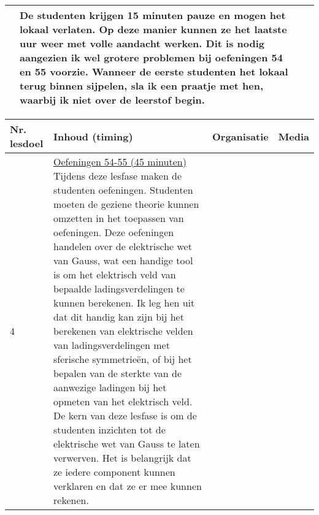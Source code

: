 \begin{landscape}
\begin{tabularx}{1.56\textwidth}{|p{1.5cm}|p{6cm}|X|p{4cm}|}
	
	&    De studenten krijgen 15 minuten pauze en mogen het lokaal verlaten. Op deze manier kunnen ze het laatste uur weer met volle aandacht werken. Dit is nodig aangezien ik wel grotere problemen bij oefeningen 54 en 55 voorzie.\newline
	Wanneer de eerste studenten het lokaal terug binnen sijpelen, sla ik een praatje met hen, waarbij ik niet over de leerstof begin. 
	& 
	\\ \hline
\end{tabularx}



\begin{tabularx}{1.56\textwidth}{|p{1.5cm}|p{6cm}|X|p{4cm}|}
	\hline
	\textbf{Nr. lesdoel } & \textbf{Inhoud (timing)}  & \textbf{Organisatie } & \textbf{Media } \\ \hline
	4\newline 5\newline 6\newline 7 \newline 8 \newline 9	&\underline{Oefeningen 54-55 (45 minuten)}\newline
	Tijdens deze lesfase maken de studenten oefeningen. Studenten moeten de geziene theorie kunnen omzetten in het toepassen van oefeningen. Deze oefeningen handelen over de elektrische wet van Gauss, wat een handige tool is om het elektrisch veld van bepaalde ladingsverdelingen te kunnen berekenen. Ik leg hen uit dat dit handig kan zijn bij het berekenen van elektrische velden van ladingsverdelingen met sferische symmetrieën, of bij het bepalen van de sterkte van de aanwezige ladingen bij het opmeten van het elektrisch veld.  \newline De kern van deze lesfase is om de studenten inzichten tot de elektrische wet van Gauss te laten verwerven. Het is belangrijk dat ze iedere component kunnen verklaren en dat ze er mee kunnen rekenen.
	

\end{tabularx}
\end{landscape}
